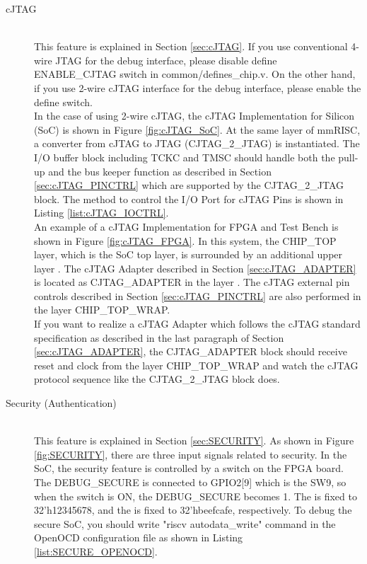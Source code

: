\begin{description}
    \item[cJTAG]\mbox{}\\
    This feature is explained in Section \ref{sec:cJTAG}. If you use conventional 4-wire JTAG for the debug interface, please disable \textasciigrave define ENABLE\_CJTAG switch in common/defines\_chip.v. On the other hand, if you use 2-wire cJTAG interface for the debug interface, please enable the define switch. \\
    In the case of using 2-wire cJTAG,  the cJTAG Implementation for Silicon (SoC) is shown in Figure \ref{fig:cJTAG_SoC}. At the same layer of mmRISC, a converter from cJTAG to JTAG (CJTAG\_2\_JTAG) is instantiated. The I/O buffer block including TCKC and TMSC should handle both the pull-up and the bus keeper function as described in Section \ref{sec:cJTAG_PINCTRL} which are supported by the CJTAG\_2\_JTAG block. The method to control the I/O Port for cJTAG Pins is shown in Listing \ref{list:cJTAG_IOCTRL}.\\
    An example of a cJTAG Implementation for FPGA and Test Bench is shown in Figure \ref{fig:cJTAG_FPGA}. In this system, the CHIP\_TOP layer, which is the SoC top layer, is surrounded by an additional upper layer . The cJTAG Adapter described in Section \ref{sec:cJTAG_ADAPTER} is located as CJTAG\_ADAPTER in the layer . The cJTAG external pin controls described in Section \ref{sec:cJTAG_PINCTRL} are also performed in the layer CHIP\_TOP\_WRAP.\\
    If you want to realize a cJTAG Adapter which follows the cJTAG standard specification as described in the last paragraph of Section \ref{sec:cJTAG_ADAPTER}, the CJTAG\_ADAPTER block should receive reset and clock from the layer CHIP\_TOP\_WRAP and watch the cJTAG protocol sequence like the CJTAG\_2\_JTAG block does.
    
    \item[Security (Authentication)]\mbox{}\\
    This feature is explained in Section \ref{sec:SECURITY}. As shown in Figure \ref{fig:SECURITY}, there are three input signals related to security. In the SoC, the security feature is controlled by a switch on the FPGA board. The DEBUG\_SECURE is connected to GPIO2[9] which is the SW9, so when the switch is ON, the DEBUG\_SECURE becomes 1. The  is fixed to 32'h12345678, and the  is fixed to 32'hbeefcafe, respectively. To debug the secure SoC, you should write "riscv autodata\_write" command in the OpenOCD configuration file as shown in Listing \ref{list:SECURE_OPENOCD}.


\end{description}
